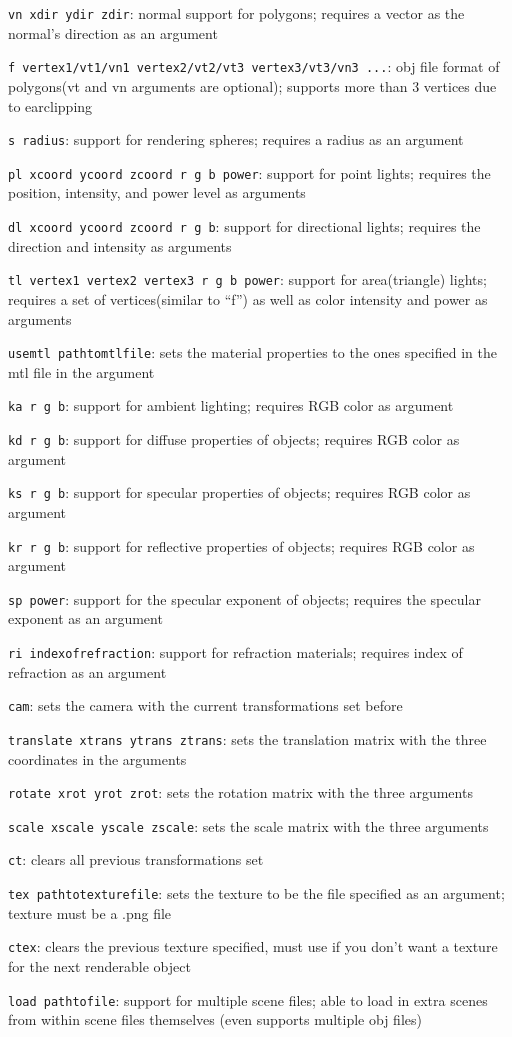 \documentclass{article}
\begin{document}
\verb+vn xdir ydir zdir+:
normal support for polygons; requires a vector as the normal’s direction as an argument

\verb+f vertex1/vt1/vn1 vertex2/vt2/vt3 vertex3/vt3/vn3 ...+:
obj file format of polygons(vt and vn arguments are optional); supports more than 3 vertices due to earclipping

\verb+s radius+:
support for rendering spheres; requires a radius as an argument

\verb+pl xcoord ycoord zcoord r g b power+:
support for point lights; requires the position, intensity, and power level as arguments

\verb+dl xcoord ycoord zcoord r g b+:
support for directional lights; requires the direction and intensity as arguments

\verb+tl vertex1 vertex2 vertex3 r g b power+:
support for area(triangle) lights; requires a set of vertices(similar to “f”) as well as color intensity and power as arguments

\verb+usemtl pathtomtlfile+:
sets the material properties to the ones specified in the mtl file in the argument

\verb+ka r g b+:
support for ambient lighting; requires RGB color as argument

\verb+kd r g b+:
support for diffuse properties of objects; requires RGB color as argument

\verb+ks r g b+:
support for specular properties of objects; requires RGB color as argument

\verb+kr r g b+:
support for reflective properties of objects; requires RGB color as argument

\verb+sp power+:
support for the specular exponent of objects; requires the specular exponent as an argument

\verb+ri indexofrefraction+:
support for refraction materials; requires index of refraction as an argument

\verb+cam+:
sets the camera with the current transformations set before

\verb+translate xtrans ytrans ztrans+:
sets the translation matrix with the three coordinates in the arguments

\verb+rotate xrot yrot zrot+:
sets the rotation matrix with the three arguments

\verb+scale xscale yscale zscale+:
sets the scale matrix with the three arguments

\verb+ct+:
clears all previous transformations set

\verb+tex pathtotexturefile+:
sets the texture to be the file specified as an argument; texture must be a .png file

\verb+ctex+:
clears the previous texture specified, must use if you don’t want a texture for the next renderable object

\verb+load pathtofile+:
support for multiple scene files; able to load in extra scenes from within scene files themselves (even supports multiple obj files)
\end{document}
